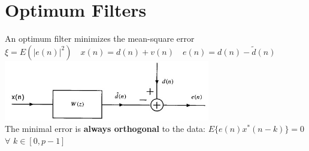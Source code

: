 \section{Optimum Filters}
An optimum filter minimizes the mean-square error $\xi = E\left(|e(n)|^2\right) \quad x(n)=d(n)+v(n) \quad e(n) = d(n) - \tilde{d}(n)$\\
\includegraphics[width=9cm]{../TSM_StatDig/bilder/optimumFilter.jpg}\\
The minimal error is \textbf{always orthogonal} to the data: $E\{e(n)x^*(n-k)\}=0$ $\forall$ $k\in[0,p-1]$

